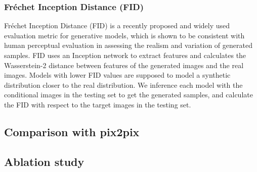 \subsubsection{Fr\'echet Inception Distance (FID)}
Fr\'echet Inception Distance (FID) \cite{FID} is a recently proposed and widely used evaluation metric for generative models, which is shown to be consistent with human perceptual evaluation in assessing the realism and variation of generated samples. FID uses an Inception network to extract features and calculates the Wasserstein-2 distance between features of the generated images and the real images. Models with lower FID values are supposed to model a synthetic distribution closer to the real distribution. We inference each model with the conditional images in the testing set to get the generated samples, and calculate the FID with respect to the target images in the testing set.
%
%
\subsection{Comparison with pix2pix}
\subsection{Ablation study}
